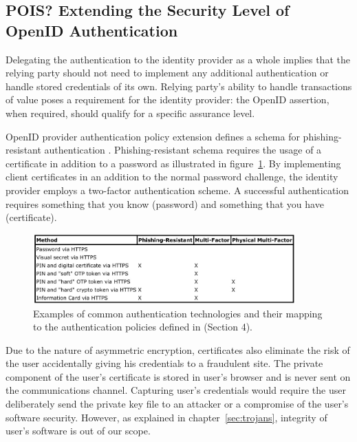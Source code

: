 \documentclass[english,gradu]{tktltiki}
\begin{document}
\subsection{POIS? Extending the Security Level of OpenID Authentication} %
\label{sub:extending_the_security_level_of_openid_authentication}

    Delegating the authentication to the identity provider as a whole implies that the relying party should not need to implement any additional authentication or handle stored credentials of its own. Relying party's ability to handle transactions of value poses a requirement for the identity provider: the OpenID assertion, when required, should qualify for a specific assurance level.

    OpenID provider authentication policy extension defines a schema for phishing-resistant authentication \cite{openid_2.0_pape_07}. Phishing-resistant schema requires the usage of a certificate in addition to a password as illustrated in figure~\ref{fig:openid_policy_examples}. By implementing client certificates in an addition to the normal password challenge, the identity provider employs a two-factor authentication scheme. A successful authentication requires something that you know (password) and something that you have (certificate).



\begin{figure}
  \centering
  \includegraphics[width=0.9\textwidth]{images/openid_authentication_policy_examples.jpg}
  \caption{Examples of common authentication technologies and their mapping to the authentication policies defined in \cite{openid_2.0_pape_07} (Section 4).}
  \label{fig:openid_policy_examples}
\end{figure}


    Due to the nature of asymmetric encryption, certificates also eliminate the risk of the user accidentally giving his credentials to a fraudulent site. The private component of the user's certificate is stored in user's browser and is never sent on the communications channel. Capturing user's credentials would require the user deliberately send the private key file to an attacker or a compromise of the user's software security. However, as explained in chapter~\ref{sec:trojans}, integrity of user's software is out of our scope.
\end{document}
